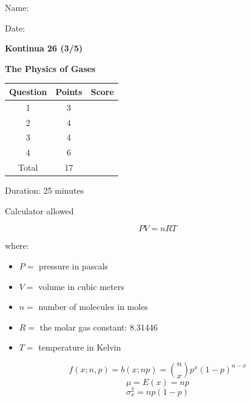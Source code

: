 \documentclass[letterpaper,12pt,addpoints]{exam}
\begin{document}
{\selectfont
\noindent \parbox{0.65\textwidth}{
Name:\ \hrulefill \\

\vspace{0.2cm}

Date:\ \hrulefill

\vspace{1.0cm}



\textbf{Kontinua 26 (3/5)}

\Large \textbf{The Physics of Gases}

} 
\parbox{0.35\textwidth}{

\begin{flushright}
\bgroup
\def\arraystretch{1.8}
\begin{tabular}{c|c|c}
\hline
Question & Points & Score \\
\hline
1 &  3  & \\
\hline
2 & 4 & \\
\hline
3 & 4 & \\
\hline
4 & 6 & \\
\hline
\hline
Total & 17 & \\ 
\hline
\end{tabular}
\egroup
\medskip

Duration: 25 minutes

Calculator allowed

\end{flushright}
}
} %

\begin{mdframed}[frametitle={Ideal Gas Law}]

$$PV = nRT$$

where:
\begin{itemize}
\item[] $P =$ pressure in pascals
\item[] $V =$ volume in cubic meters
\item[] $n =$ number of molecules in moles
\item[] $R =$ the molar gas constant: 8.31446
\item[] $T =$ temperature in Kelvin
\end{itemize}
\end{mdframed}


\begin{mdframed}[style=important, frametitle={Binomial Distribution}]
$$f(x;n,p)=b(x;np)=\binom{n}{x}p^x(1-p)^{n-x}$$
$$\mu=E(x)=np$$
$$\sigma^2_x=np(1-p)$$
\end{mdframed}
\end{document}
